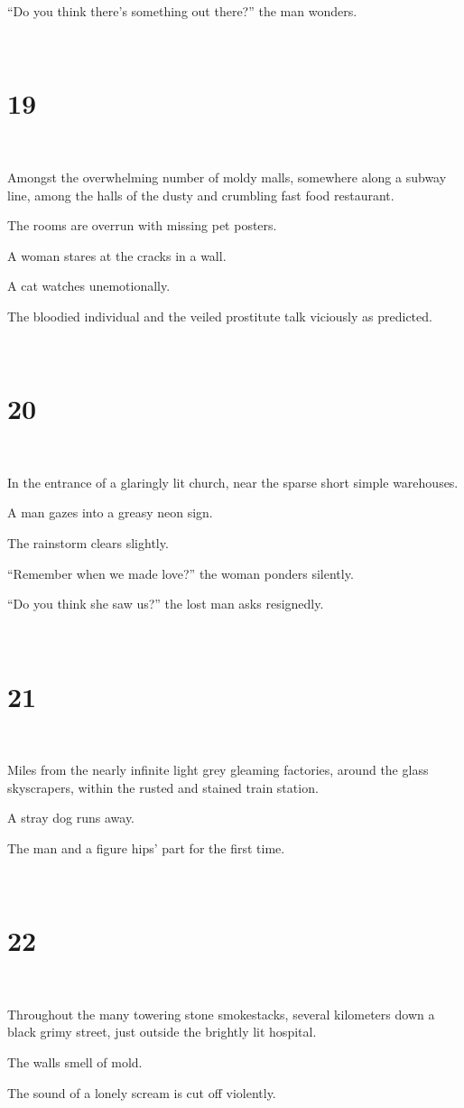 \documentclass{report}
\begin{document}
``Do you think there's something out there?'' the man wonders.

~
\chapter*{19}
~

Amongst the overwhelming number of moldy malls, somewhere along a subway line, among the halls of the dusty and crumbling fast food restaurant.

The rooms are overrun with missing pet posters.

A woman stares at the cracks in a wall.

A cat watches unemotionally.

The bloodied individual and the veiled prostitute talk viciously as predicted.

~
\chapter*{20}
~

In the entrance of a glaringly lit church, near the sparse short simple warehouses.

A man gazes into a greasy neon sign.

The rainstorm clears slightly.

``Remember when we made love?'' the woman ponders silently.

``Do you think she saw us?'' the lost man asks resignedly.

~
\chapter*{21}
~

Miles from the nearly infinite light grey gleaming factories, around the glass skyscrapers, within the rusted and stained train station.

A stray dog runs away.

The man and a figure hips' part for the first time.

~
\chapter*{22}
~

Throughout the many towering stone smokestacks, several kilometers down a black grimy street, just outside the brightly lit hospital.

The walls smell of mold.

The sound of a lonely scream is cut off violently.
\end{document}
